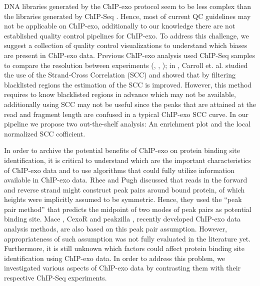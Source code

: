 \documentclass{bmcart}\usepackage[]{graphicx}\usepackage[]{color}
\begin{document}
DNA libraries generated by the ChIP-exo protocol seem to be less
complex than the libraries generated by ChIP-Seq
\cite{exo_review}. Hence, most of current QC guidelines
\cite{encode_qc} may not be applicable on ChIP-exo, additionally to
our knowledge there are not established quality control pipelines for
ChIP-exo. To address this challenge, we suggest a collection of
quality control visualizations to understand which biases are present
in ChIP-exo data. Previous ChIP-exo analysis used ChIP-Seq samples to
compare the resolution between experiments (\cite{exo1}, \cite{exo2},
\cite{exoillumina}); in \cite{carroll.qc}, Carroll et. al. studied the
use of the Strand-Cross Correlation (SCC) \cite{strandcc} and showed
that by filtering blacklisted regions the estimation of the SCC is
improved. However, this method requires to know blacklisted regions in
advance which may not be available, additionally using SCC may not be
useful since the peaks that are attained at the read and fragment
length are confused in a typical ChIP-exo SCC curve.  In our pipeline
we propose two out-the-shelf analysis: An enrichment plot and the
local normalized SCC cofficient.

In order to archive the potential benefits of ChIP-exo on protein
binding site identification, it is critical to understand which are
the important characteristics of ChIP-exo data and to use algorithms
that could fully utilize information available in ChIP-exo data. Rhee
and Pugh \cite{exo1} discussed that reads in the forward and reverse
strand might construct peak pairs around bound protein, of which
heights were implicitly assumed to be symmetric. Hence, they used the
``peak pair method'' that predicts the midpoint of two modes of peak
pairs as potential binding site. Mace \cite{mace}, CexoR \cite{cexor}
and peakzilla \cite{peakzilla}, recently developed ChIP-exo data
analysis methods, are also based on this peak pair
assumption. However, appropriateness of such assumption was not fully
evaluated in the literature yet.  Furthermore, it is still unknown
which factors could affect protein binding site identification using
ChIP-exo data. In order to address this problem, we investigated
various aspects of ChIP-exo data by contrasting them with their
respective ChIP-Seq experiments.
\end{document}

